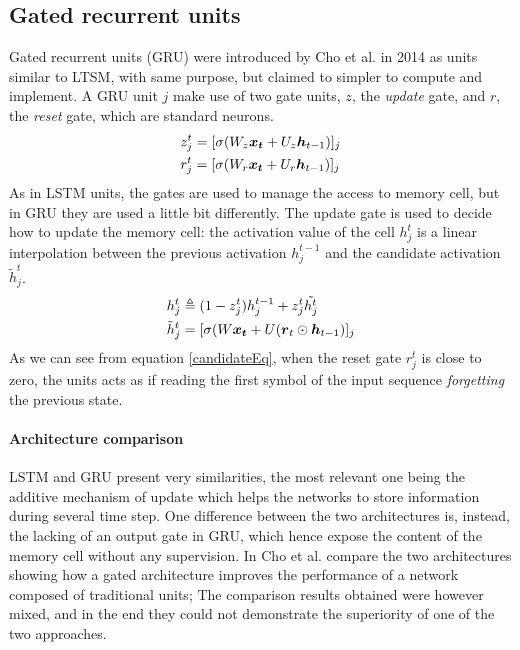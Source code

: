  
\subsection{Gated recurrent units}

Gated recurrent units (GRU) were introduced by Cho et al. in 2014 \cite{gru} as units similar to LTSM, with same purpose, 
but claimed to simpler to compute and implement. A GRU unit $j$ make use of two gate units, $z$, the 
\textit{update} gate, and $r$, the \textit{reset} gate, which are standard neurons.
\begin{align}
 &z_j^t = [\sigma(W_z\boldsymbol{x_t} + U_z\boldsymbol{h}_{t-1})]_j\\
 &r_j^t = [\sigma(W_r\boldsymbol{x_t} + U_r\boldsymbol{h}_{t-1})]_j\\
\end{align}
As in LSTM units, the gates are used to manage the access to memory cell, but in GRU they are used a little bit 
differently. The update gate is used to decide how to update the memory cell: the activation value of the cell 
$h_j^{t}$ is a linear interpolation between the previous activation $h_j^{t-1}$ and the candidate activation 
$\tilde{h}_j^t$.
\begin{align}
 &h_j^t \triangleq (1-z_j^t)h_j^{t-1} + z_j^t\tilde{h^t_j}\\
  \label{candidateEq}
 &\tilde{h}_j^t = [\sigma(W\boldsymbol{x_t} + U(\boldsymbol{r}_t \odot \boldsymbol{h}_{t-1})]_j
\end{align}
As we can see from equation \ref{candidateEq}, when the reset gate $r_j^t$ is close to zero, the units acts as if 
reading the first symbol of the input sequence \textit{forgetting} the previous state.

\paragraph{Architecture comparison}
LSTM and GRU present very similarities, the most relevant one being the additive mechanism of update which helps the 
networks to store information during several time step. One difference between the two architectures is, instead, the 
lacking of an output gate in GRU, which hence expose the content of the memory cell without any supervision. In 
\cite{gru_lstm_empirical} Cho et al. compare the two architectures showing how a gated architecture improves the 
performance of a network composed of traditional units; The comparison results obtained were however mixed, and in the 
end they could not demonstrate the superiority of one of the two approaches.

